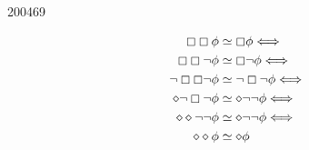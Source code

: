 \documentclass[10pt,\jkfside,a4paper]{article}
\begin{document}
\begin{examquestion}{2004}{6}{9}
\begin{enumerate}
\begin{align*}
\boxempty \boxempty \phi &\simeq \boxempty \phi \Longleftrightarrow \\
\boxempty \boxempty \neg \phi &\simeq \boxempty \neg \phi \Longleftrightarrow \\
\neg \boxempty \boxempty \neg\phi &\simeq \neg \boxempty \neg\phi
\Longleftrightarrow \\
\diamond \neg \boxempty \neg\phi &\simeq \diamond \neg\neg\phi
\Longleftrightarrow \\
\diamond \diamond \neg\neg\phi &\simeq \diamond \neg\neg\phi
\Longleftrightarrow \\
\diamond \diamond \phi &\simeq \diamond \phi \\
\end{align*}

\end{enumerate}

\end{examquestion}
\end{document}
